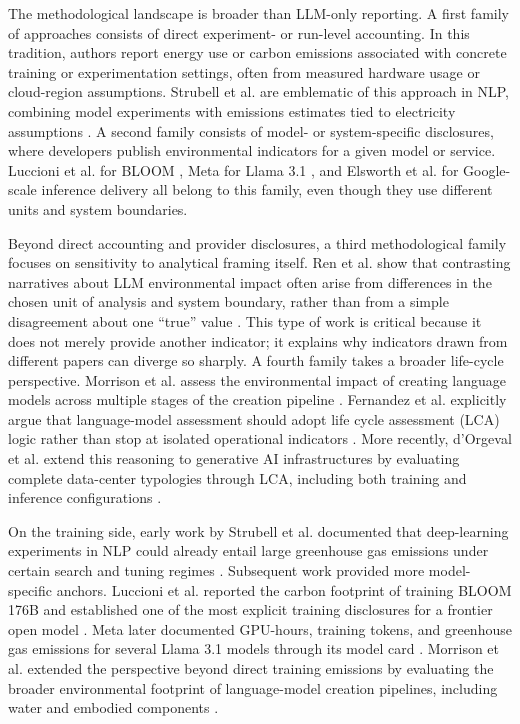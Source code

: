 \documentclass[11pt,a4paper]{article}
\begin{document}
The methodological landscape is broader than LLM-only reporting. A first family of approaches consists of direct experiment- or run-level accounting. In this tradition, authors report energy use or carbon emissions associated with concrete training or experimentation settings, often from measured hardware usage or cloud-region assumptions. Strubell et al. are emblematic of this approach in NLP, combining model experiments with emissions estimates tied to electricity assumptions \cite{strubell2019}. A second family consists of model- or system-specific disclosures, where developers publish environmental indicators for a given model or service. Luccioni et al. for BLOOM \cite{luccioni2023}, Meta for Llama 3.1 \cite{meta2024llama}, and Elsworth et al. for Google-scale inference delivery \cite{elsworth2025} all belong to this family, even though they use different units and system boundaries.

Beyond direct accounting and provider disclosures, a third methodological family focuses on sensitivity to analytical framing itself. Ren et al. show that contrasting narratives about LLM environmental impact often arise from differences in the chosen unit of analysis and system boundary, rather than from a simple disagreement about one ``true'' value \cite{ren2024}. This type of work is critical because it does not merely provide another indicator; it explains why indicators drawn from different papers can diverge so sharply. A fourth family takes a broader life-cycle perspective. Morrison et al. assess the environmental impact of creating language models across multiple stages of the creation pipeline \cite{morrison2025}. Fernandez et al. explicitly argue that language-model assessment should adopt life cycle assessment (LCA) logic rather than stop at isolated operational indicators \cite{fernandez2025lca}. More recently, d'Orgeval et al. extend this reasoning to generative AI infrastructures by evaluating complete data-center typologies through LCA, including both training and inference configurations \cite{dorgeval2026}.

On the training side, early work by Strubell et al. documented that deep-learning experiments in NLP could already entail large greenhouse gas emissions under certain search and tuning regimes \cite{strubell2019}. Subsequent work provided more model-specific anchors. Luccioni et al. reported the carbon footprint of training BLOOM 176B and established one of the most explicit training disclosures for a frontier open model \cite{luccioni2023}. Meta later documented GPU-hours, training tokens, and greenhouse gas emissions for several Llama 3.1 models through its model card \cite{meta2024llama}. Morrison et al. extended the perspective beyond direct training emissions by evaluating the broader environmental footprint of language-model creation pipelines, including water and embodied components \cite{morrison2025}.
\end{document}

